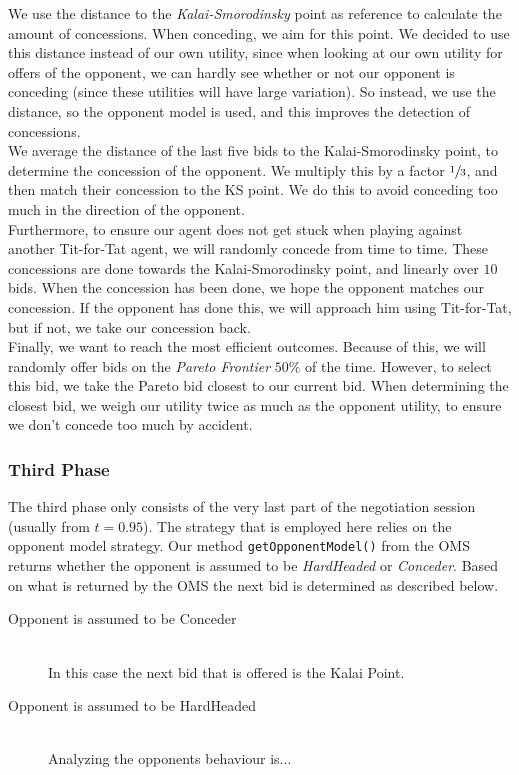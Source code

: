 We use the distance to the \emph{Kalai-Smorodinsky} point as reference to calculate
the amount of concessions. When conceding, we aim for this point.
We decided to use this distance instead of our own utility, since when looking
at our own utility for offers of the opponent, we can hardly see whether or not
our opponent is conceding (since these utilities will have large variation).
So instead, we use the distance, so the opponent model is used, and 
this improves the detection of concessions. \\

We average the distance of the last five bids to the Kalai-Smorodinsky point,
to determine the concession of the opponent. We
multiply this by a factor $\sfrac{1}{3}$, and then match their concession to the KS point.
We do this to avoid conceding too much in the direction of the opponent. \\

Furthermore, to ensure our agent does not get stuck when playing against 
another Tit-for-Tat agent, we will randomly concede from time to time. 
These concessions are done towards the Kalai-Smorodinsky point, and linearly over 
$10$ bids. When the concession has been done, we hope the opponent matches 
our concession. If the opponent has done this, we will approach him
using Tit-for-Tat, but if not, we take our concession back. \\

Finally, we want to reach the most efficient outcomes. Because of this,
we will randomly offer bids on the \emph{Pareto Frontier} $50\%$ of the time.
However, to select this bid, we take the Pareto bid closest to our current bid.
When determining the closest bid, we weigh our utility twice as much
as the opponent utility, to ensure we don't concede too much by accident.

\subsubsection{Third Phase}

The third phase only consists of the very last part of the negotiation session (usually from $t = 0.95$). The strategy that is employed here relies on the opponent model strategy. Our method \texttt{getOpponentModel()} from the OMS returns whether the opponent is assumed to be \emph{HardHeaded} or \emph{Conceder}. Based on what is returned by the OMS the next bid is determined as described below.

\begin{description}
  \item[Opponent is assumed to be Conceder] \hfill \\
  In this case the next bid that is offered is the Kalai Point.

  \item[Opponent is assumed to be HardHeaded] \hfill \\
  Analyzing the opponents behaviour is...
\end{description}

